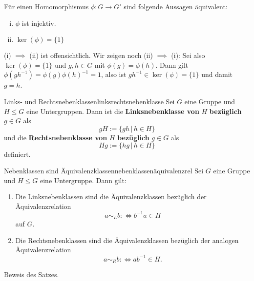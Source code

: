 \begin{satz}{}{}
Für einen Homomorphismus $\phi: G \to G'$ sind folgende Aussagen äquivalent:
\begin{enumerate}[(i)]
\item $\phi$ ist injektiv.
\item $\ker (\phi) = \{1\}$
\end{enumerate}
\end{satz}
\begin{beweis}
(i) $\implies$ (ii) ist offensichtlich. Wir zeigen noch (ii) $\implies$ (i):
Sei also $\ker (\phi) = \{1\}$ und $g,h \in G$ mit $\phi(g) = \phi(h)$. Dann gilt $\phi(gh^{-1})=\phi(g)\phi(h)^{-1} =1$, also ist $gh^{-1} \in \ker (\phi) = \{1\}$ und damit $g = h$.
\end{beweis}
\begin{definition}{Links- und Rechtsnebenklassen}{linksrechtsnebenklasse}
Sei $G$ eine Gruppe und $H \leq G$ eine Untergruppen. Dann ist die \textbf{Linksnebenklasse von} $H$ \textbf{bezüglich} $g \in G$ als 
\begin{equation}
gH := \{gh \, | \, h \in H\}
\end{equation}
und die \textbf{Rechtsnebenklasse von} $H$ \textbf{bezüglich} $g \in G$ als 
\begin{equation}
Hg := \{hg \, | \, h \in H \}
\end{equation}
definiert.
\end{definition}
\begin{satz}{Nebenklassen sind Äquivalenzklassen}{nebenklassenäquivalenzrel}
Sei $G$ eine Gruppe und $H \leq G$ eine Untergruppe. Dann gilt:
\begin{enumerate}
\item Die Linksnebenklassen sind die Äquivalenzklassen bezüglich der Äquivalenzrelation
\begin{equation}
a \sim_L b :\iff b^{-1}a \in H
\end{equation}
auf $G$.
\item Die Rechtsnebenklassen sind die Äquivalenzklassen bezüglich der analogen Äquivalenzrelation
\begin{equation}
a \sim_R b : \iff ab^{-1} \in H.
\end{equation}
\end{enumerate}
\end{satz}
\begin{übung}
Beweis des Satzes.
\end{übung}
